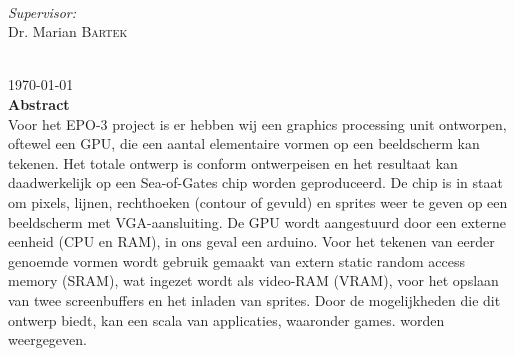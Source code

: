 \documentclass[12pt]{scrreprt}
\begin{document}
\begin{titlepage}
\begin{minipage}{0.4\textwidth}
\begin{flushleft}
\end{flushleft}
\end{minipage}
~
\begin{minipage}{0.4\textwidth}
\begin{flushright} \large
\emph{Supervisor:} \\
Dr. Marian \textsc{Bartek} %
\end{flushright}
\end{minipage}\\[3cm]



{\large \today}\\ [1.5cm]


 
% 

\textbf{Abstract} \\
Voor het EPO-3 project is er hebben wij een graphics processing unit ontworpen, oftewel een GPU, die een aantal elementaire vormen op een beeldscherm kan tekenen. Het totale ontwerp is conform ontwerpeisen en het resultaat kan daadwerkelijk op een Sea-of-Gates chip worden geproduceerd. De chip is in staat om pixels, lijnen, rechthoeken (contour of gevuld) en sprites weer te geven op een beeldscherm met VGA-aansluiting. De GPU wordt aangestuurd door een externe eenheid (CPU en RAM), in ons geval een arduino. Voor het tekenen van eerder genoemde vormen wordt gebruik gemaakt van extern static random access memory (SRAM), wat ingezet wordt als video-RAM (VRAM), voor het opslaan van twee screenbuffers en het inladen van sprites. Door de mogelijkheden die dit ontwerp biedt, kan een scala van applicaties, waaronder games. worden weergegeven.

\vfill %

\end{titlepage}
\end{document}
